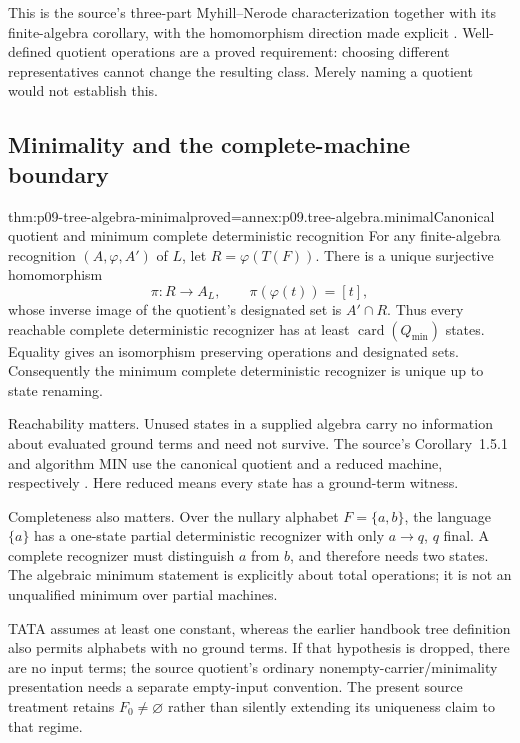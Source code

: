 This is the source's three-part Myhill--Nerode characterization together
with its finite-algebra corollary, with the homomorphism direction made
explicit \parencite[p.~36]{ComonEtAl2007}.
Well-defined quotient operations are a proved requirement:
choosing different representatives cannot change the resulting class.
Merely naming a quotient would not establish this.

\subsection{Minimality and the complete-machine boundary}
\label{sec:p09-tree-algebra-minimal}

\begin{hbtheorem}{thm:p09-tree-algebra-minimal}{proved=annex:p09.tree-algebra.minimal}{Canonical quotient and minimum complete deterministic recognition}
For any finite-algebra recognition \((A,\varphi,A')\) of \(L\), let
\(R=\varphi(T(F))\). There is a unique surjective homomorphism
\[
 \pi:R\to A_L,\qquad \pi(\varphi(t))=[t],
\]
whose inverse image of the quotient's designated set is \(A'\cap R\).
Thus every reachable complete deterministic recognizer has at least
\(\operatorname{card}(Q_{\min})\) states. Equality gives an isomorphism
preserving operations and designated sets. Consequently the minimum
complete deterministic recognizer is unique up to state renaming.
\end{hbtheorem}

Reachability matters. Unused states in a supplied algebra carry no
information about evaluated ground terms and need not survive.
The source's Corollary~1.5.1 and algorithm MIN use the canonical quotient
and a reduced machine, respectively \parencite[p.~37]{ComonEtAl2007}.
Here reduced means every state has a ground-term witness.

Completeness also matters. Over the nullary alphabet \(F=\{a,b\}\),
the language \(\{a\}\) has a one-state partial deterministic recognizer
with only \(a\to q\), \(q\) final. A complete recognizer must distinguish
\(a\) from \(b\), and therefore needs two states.
The algebraic minimum statement is explicitly about total operations;
it is not an unqualified minimum over partial machines.

TATA assumes at least one constant, whereas the earlier handbook tree
definition also permits alphabets with no ground terms. If that hypothesis
is dropped, there are no input terms; the source quotient's ordinary
nonempty-carrier/minimality presentation needs a separate empty-input
convention. The present source treatment retains \(F_0\ne\varnothing\)
rather than silently extending its uniqueness claim to that regime.

